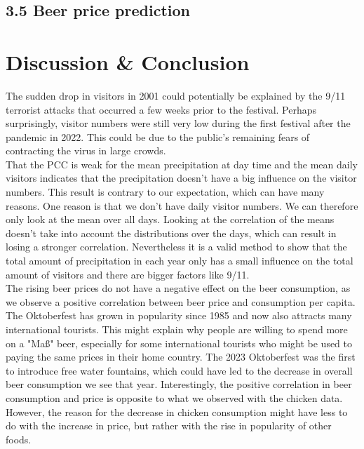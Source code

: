 \documentclass{article}
\theoremstyle{plain}
\theoremstyle{definition}
\theoremstyle{remark}
\begin{document}
\subsection*{3.5 Beer price prediction}

\section{Discussion \& Conclusion}\label{sec:conclusion}
The sudden drop in visitors in 2001 could potentially be explained by the 9/11 terrorist attacks that occurred a few weeks prior to the festival. Perhaps surprisingly, visitor numbers were still very low during the first festival after the pandemic in 2022. This could be due to the public's remaining fears of contracting the virus in large crowds.\\

That the PCC is weak for the mean precipitation at day time and the mean daily visitors indicates that the precipitation doesn't have a big influence on the visitor numbers. This result is contrary to our expectation, which can have many reasons. One reason is that we don't have daily visitor numbers. We can therefore only look at the mean over all days. Looking at the correlation of the means doesn't take into account the distributions over the days, which can result in losing a stronger correlation. Nevertheless it is a valid method to show that the total amount of precipitation in each year only has a small influence on the total amount of visitors and there are bigger factors like 9/11.\\

The rising beer prices do not have a negative effect on the beer consumption, as we observe a positive correlation between beer price and consumption per capita. The Oktoberfest has grown in popularity since 1985 and now also attracts many international tourists. This might explain why people are willing to spend more on a "Maß" beer, especially for some international tourists who might be used to paying the same prices in their home country. The 2023 Oktoberfest was the first to introduce free water fountains, which could have led to the decrease in overall beer consumption we see that year. Interestingly, the positive correlation in beer consumption and price is opposite to what we observed with the chicken data. However, the reason for the decrease in chicken consumption might have less to do with the increase in price, but rather with the rise in popularity of other foods.\\
\end{document}
